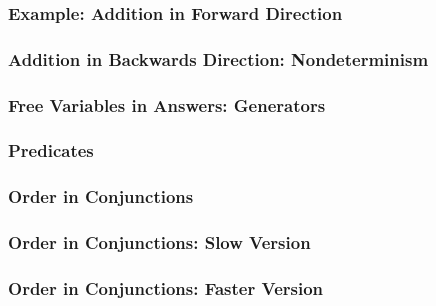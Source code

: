\documentclass[xcolor=table]{beamer}
\begin{document}
\lstset{basicstyle=\small}

\begin{frame}[fragile]
  \frametitle{Example: Addition in Forward Direction}



\end{frame}

\begin{frame}[fragile]
  \frametitle{Addition in Backwards Direction: Nondeterminism}



\end{frame}

\begin{frame}[fragile]
  \frametitle{Free Variables in Answers: Generators}



\end{frame}

\begin{frame}[fragile]
  \frametitle{Predicates}
  

  
\end{frame}


\begin{frame}[fragile]
  \frametitle{Order in Conjunctions}
  
\end{frame}

\begin{frame}[fragile]
  \frametitle{Order in Conjunctions: Slow Version}
  
\end{frame}


\begin{frame}[fragile]
  \frametitle{Order in Conjunctions: Faster Version}
  
\end{frame}
\end{document}
